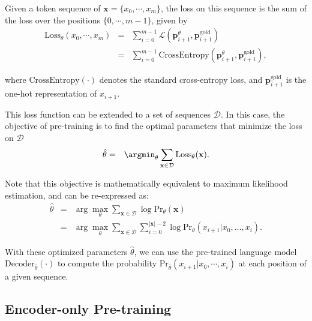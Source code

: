 Given a token sequence of $\mathbf{x} = \{x_0,\cdots,x_m\}$, the loss on this sequence is the sum of the loss over the positions $\{0,\cdots,m-1\}$, given by
\begin{eqnarray}
\mathrm{Loss}_{\theta}(x_0,\cdots,x_m) & = & \sum_{i=0}^{m-1} \mathcal{L}(\mathbf{p}_{i+1}^{\theta},\mathbf{p}_{i+1}^{\mathrm{gold}}) \nonumber \\
                                       & = & \sum_{i=0}^{m-1} \mathrm{CrossEntropy}(\mathbf{p}_{i+1}^{\theta},\mathbf{p}_{i+1}^{\mathrm{gold}}),
\end{eqnarray}

\noindent where $\mathrm{CrossEntropy}(\cdot)$ denotes the standard cross-entropy loss, and $\mathbf{p}_{i+1}^{\mathrm{gold}}$ is the one-hot representation of $x_{i+1}$.

This loss function can be extended to a set of sequences $\mathcal{D}$. In this case, the objective of pre-training is to find the optimal parameters that minimize the loss on $\mathcal{D}$
\begin{eqnarray}
\hat{\theta} & = & \argmin_{\theta} \sum_{\mathbf{x} \in \mathcal{D}} \mathrm{Loss}_{\theta}(\mathbf{x}).
\end{eqnarray}

\noindent Note that this objective is mathematically equivalent to maximum likelihood estimation, and can be re-expressed as:
\begin{eqnarray}
\hat{\theta} & = & \arg\max_{\theta} \sum_{\mathbf{x} \in \mathcal{D}} \log \mathrm{Pr}_{\theta}(\mathbf{x}) \nonumber \\
             & = & \arg\max_{\theta} \sum_{\mathbf{x} \in \mathcal{D}} \sum_{i=0}^{|\mathbf{x}|-2} \log \mathrm{Pr}_{\theta}(x_{i+1} | x_0, \dots, x_{i}).
\end{eqnarray}

With these optimized parameters $\hat{\theta}$, we can use the pre-trained language model $\mathrm{Decoder}_{\hat{\theta}}(\cdot)$ to compute the probability $\mathrm{Pr}_{\hat{\theta}}(x_{i+1} | x_0,\cdots,x_i)$ at each position of a given sequence.

\subsection{Encoder-only Pre-training}
\label{sec:encoder-only-pre-training}

